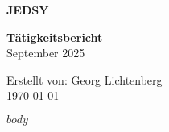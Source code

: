 \documentclass[a4paper]{article}
\newcommand{\jedsyname}{%
  \textcolor{jedsy}{%
    \fontsize{20}{24}\selectfont\textbf{JEDSY}}%
}
\begin{document}
\begin{titlepage}
    \centering
    \vspace*{2cm}
    
    \jedsyname
    
    \vspace{1.5cm}
    {\huge \textbf{Tätigkeitsbericht}}\\
    \vspace{0.5cm}
    {\Large September 2025}\\
    \vspace{1cm}
    
    \vfill
    
    {\large Erstellt von: Georg Lichtenberg}\\
    {\large \today}
    
\end{titlepage}

\tableofcontents
\newpage

$body$
\end{document}
